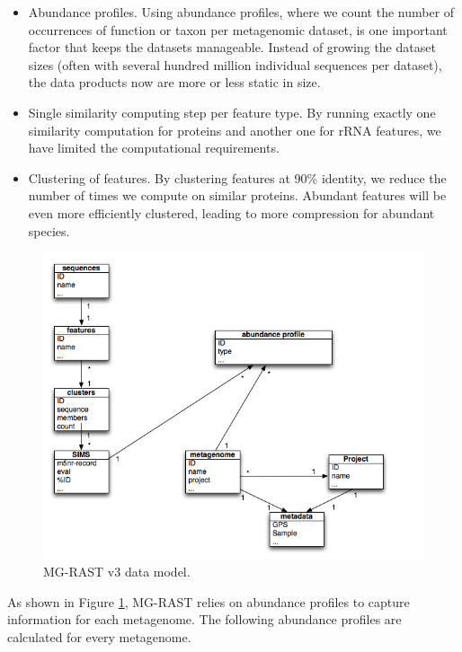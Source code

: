 \documentclass[12pt,fullpage]{report}
\begin{document}
\begin{itemize}
\item Abundance profiles.
Using abundance profiles, where we count the number of occurrences of function or taxon per metagenomic dataset, is one important factor that keeps the datasets manageable. Instead of growing the dataset sizes (often with several hundred million individual sequences per dataset), the data products now are more or less static in size.

\item Single similarity computing step per feature type.
By running exactly one similarity computation for proteins and another one for \gls{rRNA} features, we have limited the computational requirements.

\item Clustering of features.
By clustering features at 90\% identity, we reduce the number of times we compute on similar proteins. Abundant features will be even more efficiently clustered, leading to more compression for abundant species.

\end{itemize}

\begin{figure}
\begin{center}
\includegraphics[width=6in]{Images/data-model.png}
\end{center}
\caption{
MG-RAST v3 data model.}
\label{fig:data-model}
\end{figure}

As shown in Figure \ref{fig:data-model}, MG-RAST relies on abundance profiles to capture information for each metagenome.
The following abundance profiles are calculated for every metagenome.
\end{document}
